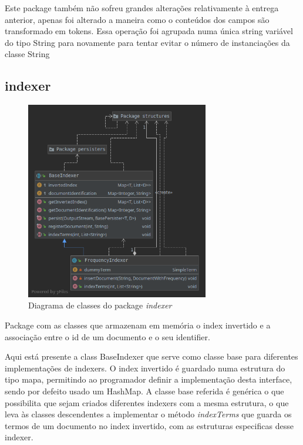 \documentclass[12pt]{article}
\begin{document}
Este package também não sofreu grandes alterações relativamente à
entrega anterior, apenas foi alterado a maneira como o conteúdos dos
campos são transformado em tokens. Essa operação foi agrupada numa
única string variável do tipo String para novamente para tentar
evitar o número de instanciações da classe String

\subsection{indexer}
\begin{figure}[h]
  \center
  \includegraphics[width=8cm]{packages_indexer.png}
  \caption{Diagrama de classes do package \it indexer}
\end{figure}

Package com as classes que armazenam em memória o index invertido e
a associação entre o id de um documento e o seu identifier.

Aqui está presente a class BaseIndexer que serve como classe base para
diferentes implementações de indexers. O index invertido é guardado numa
estrutura do tipo mapa, permitindo ao programador definir a implementação
desta interface, sendo por defeito usado um HashMap. A classe base referida
é genérica o que possibilita que sejam criados diferentes indexers com a
mesma estrutura, o que leva às classes descendentes a implementar o método
{\it indexTerms} que guarda os termos de um documento no index invertido,
com as estruturas especificas desse indexer.
\end{document}
